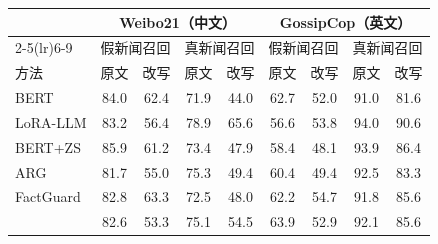 \begin{tabular}{lcccccccc}
\toprule
 & \multicolumn{4}{c}{Weibo21（中文）} & \multicolumn{4}{c}{GossipCop（英文）} \\
\cmidrule(lr){2-5}\cmidrule(lr){6-9}
 & \multicolumn{2}{c}{假新闻召回} & \multicolumn{2}{c}{真新闻召回} & \multicolumn{2}{c}{假新闻召回} & \multicolumn{2}{c}{真新闻召回} \\
方法 & 原文 & 改写 & 原文 & 改写 & 原文 & 改写 & 原文 & 改写 \\
\midrule
BERT & 84.0 & 62.4 & 71.9 & 44.0 & 62.7 & 52.0 & 91.0 & 81.6 \\
LoRA-LLM & 83.2 & 56.4 & 78.9 & 65.6 & 56.6 & 53.8 & 94.0 & 90.6 \\
BERT+ZS & 85.9 & 61.2 & 73.4 & 47.9 & 58.4 & 48.1 & 93.9 & 86.4 \\
ARG & 81.7 & 55.0 & 75.3 & 49.4 & 60.4 & 49.4 & 92.5 & 83.3 \\
FactGuard & 82.8 & 63.3 & 72.5 & 48.0 & 62.2 & 54.7 & 91.8 & 85.6 \\
\method{} & 82.6 & 53.3 & 75.1 & 54.5 & 63.9 & 52.9 & 92.1 & 85.6 \\
\bottomrule
\end{tabular}
